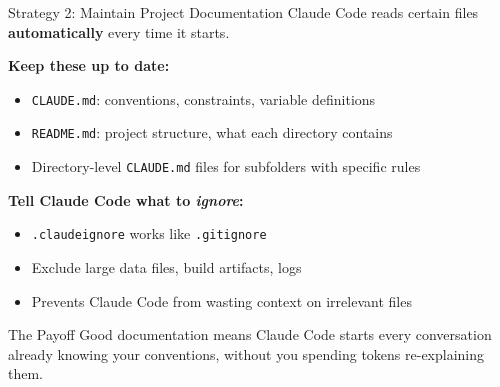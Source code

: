 \documentclass[aspectratio=169, 11pt]{beamer}
\begin{document}
\begin{frame}{Strategy 2: Maintain Project Documentation}
  Claude Code reads certain files \textbf{automatically} every time it starts.

  \vspace{0.5em}
  \textbf{Keep these up to date:}
  \begin{itemize}
    \item \texttt{CLAUDE.md}: conventions, constraints, variable definitions
    \item \texttt{README.md}: project structure, what each directory contains
    \item Directory-level \texttt{CLAUDE.md} files for subfolders with specific rules
  \end{itemize}

  \vspace{0.5em}
  \textbf{Tell Claude Code what to \textit{ignore}:}
  \begin{itemize}
    \item \texttt{.claudeignore} works like \texttt{.gitignore}
    \item Exclude large data files, build artifacts, logs
    \item Prevents Claude Code from wasting context on irrelevant files
  \end{itemize}

  \vspace{0.5em}
  \begin{block}{The Payoff}
    Good documentation means Claude Code starts every conversation already knowing your conventions, without you spending tokens re-explaining them.
  \end{block}
\end{frame}
\end{document}
